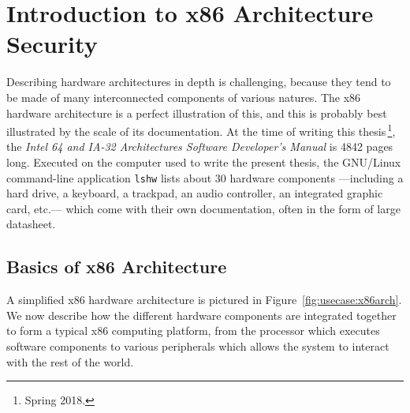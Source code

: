 \section{Introduction to x86 Architecture Security}
\label{sec:usecase:architecture}

Describing hardware architectures in depth is challenging, because they tend to
be made of many interconnected components of various natures.
%
The x86 hardware architecture is a perfect illustration of this, and this is
probably best illustrated by the scale of its documentation.
%
At the time of writing this thesis\,\footnote{Spring 2018.}, the \emph{Intel 64
  and IA-32 Architectures Software Developer’s Manual} is 4842 pages long.
%
Executed on the computer used to write the present thesis, the GNU/Linux
command-line application \texttt{lshw} lists about 30 hardware components
---including a hard drive, a keyboard, a trackpad, an audio controller, an
integrated graphic card, etc.--- which come with their own documentation, often
in the form of large datasheet.

\subsection{Basics of x86 Architecture}

A simplified x86 hardware architecture is pictured in
Figure~\ref{fig:usecase:x86arch}.
%
We now describe how the different hardware components are integrated together to
form a typical x86 computing platform, from the processor which executes
software components to various peripherals which allows the system to interact
with the rest of the world.

